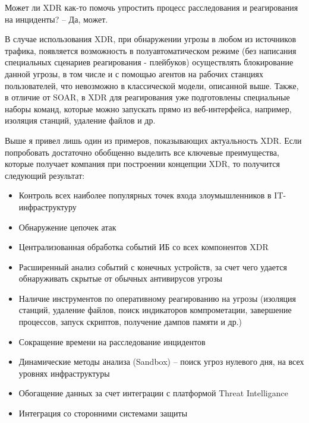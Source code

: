Может ли XDR как-то помочь упростить процесс расследования и реагирования на инциденты? – Да, может.

В случае использования XDR, при обнаружении угрозы в любом из источников трафика, появляется возможность в полуавтоматическом режиме (без написания специальных сценариев реагирования - плейбуков) осуществлять блокирование данной угрозы, в том числе и с помощью агентов на рабочих станциях пользователей, что невозможно в классической модели, описанной выше. Также, в отличие от SOAR, в XDR для реагирования уже подготовлены специальные наборы команд, которые можно запускать прямо из веб-интерфейса, например, изоляция станций, удаление файлов и др.

Выше я привел лишь один из примеров, показывающих актуальность XDR. Если попробовать достаточно обобщенно выделить все ключевые преимущества, которые получает компания при построении концепции XDR, то получится следующий результат:

\begin{itemize}

\item Контроль всех наиболее популярных точек входа злоумышленников в IT-инфраструктуру

\item Обнаружение цепочек атак

\item Централизованная обработка событий ИБ со всех компонентов XDR

\item Расширенный анализ событий с конечных устройств, за счет чего удается обнаруживать скрытые от обычных антивирусов угрозы

\item Наличие инструментов по оперативному реагированию на угрозы (изоляция станций, удаление файлов, поиск индикаторов компрометации, завершение процессов, запуск скриптов, получение дампов памяти и др.)

\item Сокращение времени на расследование инцидентов

\item Динамические методы анализа (Sandbox) – поиск угроз нулевого дня, на всех уровнях инфраструктуры

\item Обогащение данных за счет интеграции с платформой Threat Intelligance

\item Интеграция со сторонними системами защиты
\end{itemize}


